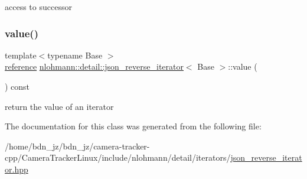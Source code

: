 access to successor 

\mbox{\label{classnlohmann_1_1detail_1_1json__reverse__iterator_ae22803d442d483041d17239615f83b58}} 
\subsubsection{\texorpdfstring{value()}{value()}}
{\footnotesize\ttfamily template$<$typename Base $>$ \\
\hyperlink{classnlohmann_1_1detail_1_1json__reverse__iterator_a42f51a69bac7b2aebb613b2164e457f1}{reference} \hyperlink{classnlohmann_1_1detail_1_1json__reverse__iterator}{nlohmann\+::detail\+::json\+\_\+reverse\+\_\+iterator}$<$ Base $>$\+::value (\begin{DoxyParamCaption}{ }\end{DoxyParamCaption}) const\hspace{0.3cm}{\ttfamily [inline]}}



return the value of an iterator 



The documentation for this class was generated from the following file\+:\begin{DoxyCompactItemize}
\item 
/home/bdn\+\_\+jz/bdn\+\_\+jz/camera-\/tracker-\/cpp/\+Camera\+Tracker\+Linux/include/nlohmann/detail/iterators/\hyperlink{json__reverse__iterator_8hpp}{json\+\_\+reverse\+\_\+iterator.\+hpp}\end{DoxyCompactItemize}
